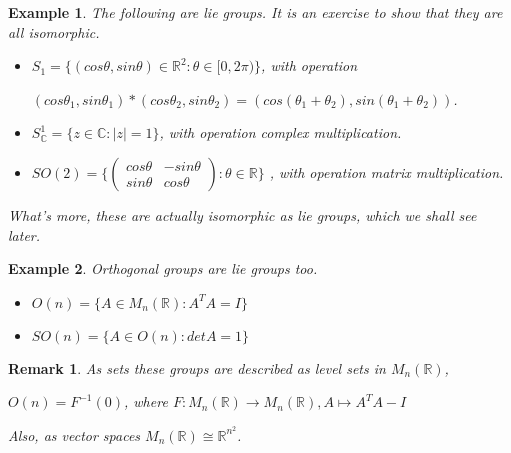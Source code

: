 \documentclass[12pt]{article}
\newcommand{\cx}{\mathbb{C}}
\newcommand{\real}{\mathbb{R}}
\newcommand{\abs}[1]{|#1|}
\newcommand\inv[1]{#1^{-1}}
\newcommand\set[1]{\{#1\}}
\newtheorem*{remark}{Remark}
\newtheorem{example}{Example}[thm]
\begin{document}
\begin{example}
  The following are lie groups. It is an exercise to show that they are all isomorphic.
\begin{itemize}
\item
  $S_1 = \set{(cos \theta, sin \theta) \in \real^2 : \theta \in [0,2\pi)}$, with operation
  \begin{center}
    $(cos \theta_1, sin \theta_1) * (cos \theta_2, sin \theta_2) = (cos (\theta_1 + \theta_2), sin (\theta_1 + \theta_2))$.
  \end{center}
 
\item
    $S_{\cx}^1 = \set{z \in \cx : \abs{z} = 1}$, with operation complex multiplication.

\item
    $SO(2) = \set{ \begin{pmatrix}
      cos \theta & - sin \theta\\
      sin \theta & cos \theta 
    \end{pmatrix} : \theta \in \real}$
  , with operation matrix multiplication.
\end{itemize}
What's more, these are actually isomorphic as lie groups, which we shall see later. 
\end{example}

\begin{example}
  Orthogonal groups are lie groups too.
  \begin{itemize}
  \item
    $O(n) = \set{A \in M_n(\real) : A^TA = I}$
  \item
    $SO(n) = \set{A \in O(n) : det A = 1}$
  \end{itemize}
\end{example}

\begin{remark}
  As sets these  groups  are described as level sets in $M_n(\real)$,
  \begin{center}
    $O(n) = \inv{F}(0)$, where $F : M_n(\real) \to M_n(\real), A \mapsto A^TA - I$
  \end{center}
  Also, as vector spaces $M_n(\real) \cong \real^{n^2}$.
\end{remark}
\end{document}
